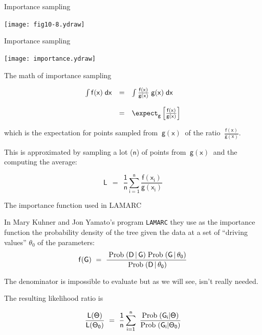 \documentclass[bluish,slideColor,colorBG,pdf]{prosper}
\def\Prob{{\rm Prob\;}}
\def\prob{{\rm \;Prob\;}}
\begin{document}
\begin{slide}[Replace]{Importance sampling}
\bigskip

\hspace{-0.2in}\texttt{[image: fig10-8.ydraw]}

\end{slide}

\begin{slide}[Replace]{Importance sampling}

\centerline{\texttt{[image: importance.ydraw]}}

\end{slide}

\begin{slide}[Replace]{The math of importance sampling}
\bigskip

\[
\begin{array}{c c l}
\mathsf{\int f(x)\;dx}  & \mathsf{=} & \mathsf{\int \frac{f(x)}{g(x)}\;g(x)\;dx }\\
& & \\
& \mathsf{=} & \mathsf{\expect_g \left[\frac{f(x)}{g(x)}\right]} \\
\end{array}
\]
\bigskip

\noindent
which is the expectation for points sampled from $~\mathsf{g(x)}~$ of the ratio $~\mathsf{\frac{f(x)}{g(x)}}$.
\bigskip

\noindent
This is approximated by sampling a lot ($\mathsf{n}$) of points from $~\mathsf{g(x)}~$ and
the computing the average:
\bigskip

\[
\mathsf{L \ \ = \ \  \frac{1}{n} \sum_{i=1}^n \frac{f(x_i)}{g(x_i)}}
\]
\bigskip

\end{slide}

\begin{slide}[Replace]{The importance function used in LAMARC}

In Mary Kuhner and Jon Yamato's program {\tt LAMARC} they use as the importance
function the probability density of the tree given the data at a set of ``driving
values'' $\theta_0$ of the parameters:
\[
\mathsf{f(G) \ = \ \frac{\prob(D\,|\,G)
\prob(G\,|\,\theta_0)}{\prob(D\,|\,\theta_0)} }
\]

The denominator is impossible to evaluate but as we will see, isn't really
needed.
\bigskip

The resulting likelihood ratio is

\[
\mathsf{\frac{L(\Theta)}{L(\Theta_0)} \ = \ \frac{1}{n}\sum\limits_{i=1}^n\
\frac{\Prob(G_i|\Theta)}{\Prob(G_i|\Theta_0)}}
\]

\end{slide}
\end{document}
